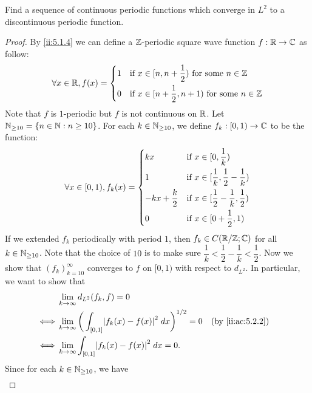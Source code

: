 \begin{ex}\label{ii:ex:5.2.5}
  Find a sequence of continuous periodic functions which converge in \(L^2\) to a discontinuous periodic function.
\end{ex}

\begin{proof}
  By \cref{ii:5.1.4} we can define a \(\mathbb{Z}\)-periodic square wave function \(f : \mathbb{R} \to \mathbb{C}\) as follow:
  \[
    \forall x \in \mathbb{R}, f(x) = \begin{dcases}
      1 & \text{if } x \in [n, n + \dfrac{1}{2}) \text{ for some } n \in \mathbb{Z}     \\
      0 & \text{if } x \in [n + \dfrac{1}{2}, n + 1) \text{ for some } n \in \mathbb{Z}
    \end{dcases}
  \]
  Note that \(f\) is \(1\)-periodic but \(f\) is not continuous on \(\mathbb{R}\).
  Let \(\mathbb{N}_{\geq 10} = \left\lbrace n \in \mathbb{N} : n \geq 10\right\rbrace\).
  For each \(k \in \mathbb{N}_{\geq 10}\), we define \(f_k : [0, 1) \to \mathbb{C}\) to be the function:
  \[
    \forall x \in [0, 1), f_k(x) = \begin{dcases}
      kx                 & \text{if } x \in [0, \dfrac{1}{k})                           \\
      1                  & \text{if } x \in [\dfrac{1}{k}, \dfrac{1}{2} - \dfrac{1}{k}) \\
      -kx + \dfrac{k}{2} & \text{if } x \in [\dfrac{1}{2} - \dfrac{1}{k}, \dfrac{1}{2}) \\
      0                  & \text{if } x \in [0 + \dfrac{1}{2}, 1)
    \end{dcases}
  \]
  If we extended \(f_k\) periodically with period \(1\), then \(f_k \in C(\mathbb{R} / \mathbb{Z} ; \mathbb{C})\) for all \(k \in \mathbb{N}_{\geq 10}\).
  Note that the choice of \(10\) is to make sure \(\dfrac{1}{k} < \dfrac{1}{2} - \dfrac{1}{k} < \dfrac{1}{2}\).
  Now we show that \((f_k)_{k = 10}^\infty\) converges to \(f\) on \([0, 1)\) with respect to \(d_{L^2}\).
  In particular, we want to show that
  \begin{align*}
         & \lim_{k \to \infty} d_{L^2}(f_k, f) = 0                                                                     \\
    \iff & \lim_{k \to \infty} \bigg(\int_{[0, 1]} \abs{f_k(x) - f(x)}^2 \; dx\bigg)^{1 / 2} = 0 &  & \by{ii:ac:5.2.2} \\
    \iff & \lim_{k \to \infty} \int_{[0, 1]} \abs{f_k(x) - f(x)}^2 \; dx = 0.
  \end{align*}
  Since for each \(k \in \mathbb{N}_{\geq 10}\), we have
  \begin{align*}

\end{align*}
\end{proof}
